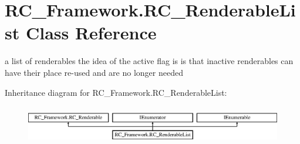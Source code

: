 \hypertarget{class_r_c___framework_1_1_r_c___renderable_list}{}\section{R\+C\+\_\+\+Framework.\+R\+C\+\_\+\+Renderable\+List Class Reference}
\label{class_r_c___framework_1_1_r_c___renderable_list}


a list of renderables the idea of the active flag is is that inactive renderables can have their place re-\/used and are no longer needed  


Inheritance diagram for R\+C\+\_\+\+Framework.\+R\+C\+\_\+\+Renderable\+List\+:\begin{figure}[H]
\begin{center}
\leavevmode
\includegraphics[height=1.704718cm]{class_r_c___framework_1_1_r_c___renderable_list}
\end{center}
\end{figure}
